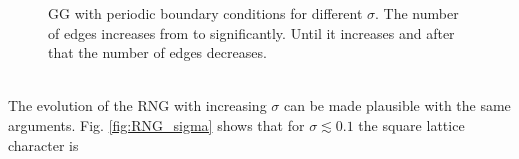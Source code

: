 \begin{figure}[htb]

            \caption[Examples of GG for different $\sigma$]
            {
                GG with periodic boundary conditions for different \(\sigma\).
                The number of edges increases from 
                to  significantly. Until 
                it increases and after that the number of edges decreases.
            }
            \label{fig:GG_sigma}
        \end{figure}\\
        The evolution of the RNG with increasing \(\sigma\) can be made plausible
        with the same arguments. Fig. \ref{fig:RNG_sigma}
        shows that for \(\sigma \lesssim 0.1\) the square lattice character is
